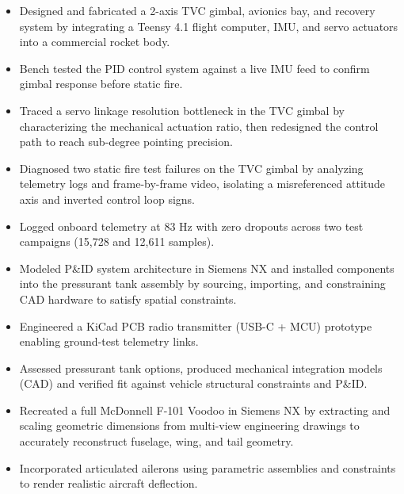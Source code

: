 \begin{itemize}
  \item Designed and fabricated a 2-axis TVC gimbal, avionics bay, and recovery system by integrating a Teensy 4.1 flight computer, IMU, and servo actuators into a commercial rocket body.
  \item Bench tested the PID control system against a live IMU feed to confirm gimbal response before static fire.
  \item Traced a servo linkage resolution bottleneck in the TVC gimbal by characterizing the mechanical actuation ratio, then redesigned the control path to reach sub-degree pointing precision.
  \item Diagnosed two static fire test failures on the TVC gimbal by analyzing telemetry logs and frame-by-frame video, isolating a misreferenced attitude axis and inverted control loop signs.
  \item Logged onboard telemetry at 83 Hz with zero dropouts across two test campaigns (15,728 and 12,611 samples).
\end{itemize}
\entrygap

\begin{itemize}
  \item Modeled P\&ID system architecture in Siemens NX and installed components into the pressurant tank assembly by sourcing, importing, and constraining CAD hardware to satisfy spatial constraints.
  \item Engineered a KiCad PCB radio transmitter (USB-C + MCU) prototype enabling ground-test telemetry links.
  \item Assessed pressurant tank options, produced mechanical integration models (CAD) and verified fit against vehicle structural constraints and P\&ID.
\end{itemize}
\entrygap

\begin{itemize}
  \item Recreated a full McDonnell F-101 Voodoo in Siemens NX by extracting and scaling geometric dimensions from multi-view engineering drawings to accurately reconstruct fuselage, wing, and tail geometry.
  \item Incorporated articulated ailerons using parametric assemblies and constraints to render realistic aircraft deflection.
\end{itemize}
\entrygap


